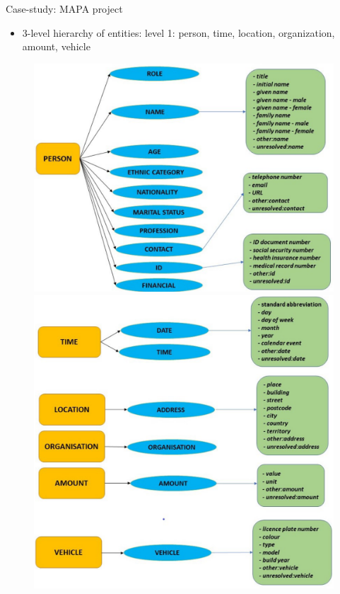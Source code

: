 \documentclass[12pt,aspectratio=169,handout]{beamer}
\begin{document}
\begin{frame}{Case-study: MAPA project}

\begin{itemize}
\item 3-level hierarchy of entities: level 1: person, time, location, organization, amount, vehicle
\end{itemize}

\begin{figure}
\includegraphics[width=0.48\linewidth]{img/mapa1}
\includegraphics[width=0.48\linewidth]{img/mapa2}
\end{figure}



\end{frame}
\end{document}
